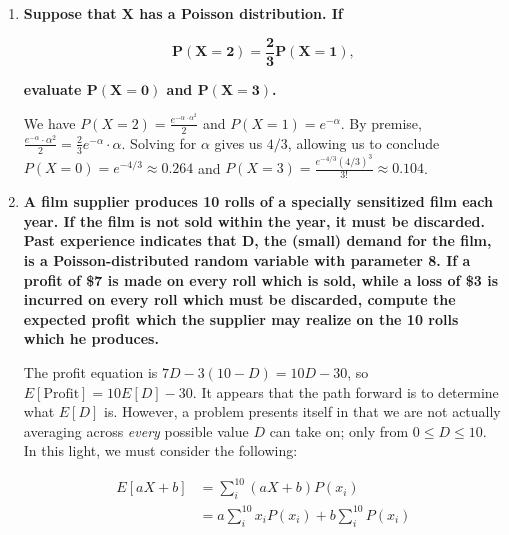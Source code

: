 \documentclass[10pt, oneside]{article}
\begin{document}
\begin{enumerate}[label=8.\arabic*]
If $X$ is the number of clients in an accident, we wish to determine $P(X \leq 5)$. Here, $\alpha = np = (10000)(0.001) = 10$. Then we have

\[ P(X \leq 5) = \sum^5_{k = 0} \frac{e^{-10} \cdot 10^k}{k!} = \boxed{0.0671} \]

\item  \begin{tcolorbox}[
  colback=Cerulean!5!white,
  colframe=Cerulean!75!black]
\textbf{Suppose that $\bm{X}$ has a Poisson distribution. If}

\[ \bm{P(X = 2) = \frac{2}{3} P(X = 1),} \]

\textbf{evaluate $\bm{P(X = 0)}$ and $\bm{P(X = 3)}$.}
\end{tcolorbox}

We have $P(X = 2) = \frac{e^{-\alpha \cdot \alpha^2}}{2}$ and $P(X = 1) = e^{-\alpha}$. By premise, $\frac{e^{-\alpha} \cdot \alpha^2}{2} = \frac{2}{3} e^{-\alpha} \cdot \alpha$. Solving for $\alpha$ gives us $4/3$, allowing us to conclude $P(X = 0) = e^{-4/3} \approx \boxed{0.264}$ and $P(X = 3) = \frac{e^{-4/3} (4/3)^3}{3!} \approx \boxed{0.104}$.

\item  \begin{tcolorbox}[
  colback=Cerulean!5!white,
  colframe=Cerulean!75!black]
\textbf{A film supplier produces 10 rolls of a specially sensitized film each year. If the film is not sold within the year, it must be discarded. Past experience indicates that $\bm{D}$, the (small) demand for the film, is a Poisson-distributed random variable with parameter 8. If a profit of \$7 is made on every roll which is sold, while a loss of \$3 is incurred on every roll which must be discarded, compute the expected profit which the supplier may realize on the 10 rolls which he produces.}
\end{tcolorbox}

The profit equation is $7D - 3(10 - D) = 10D - 30$, so $E[\text{Profit}] = 10 E[D] - 30$. It appears that the path forward is to determine what $E[D]$ is. However, a problem presents itself in that we are not actually averaging across \textit{every} possible value $D$ can take on; only from $0 \leq D \leq 10$. In this light, we must consider the following:

\begin{align*}
E[aX+b] &= \sum^{10}_i (aX + b) P(x_i) \\
&= a \sum^{10}_i x_i P(x_i) + b \sum^{10}_i P(x_i)
\end{align*}


\end{enumerate}
\end{document}
